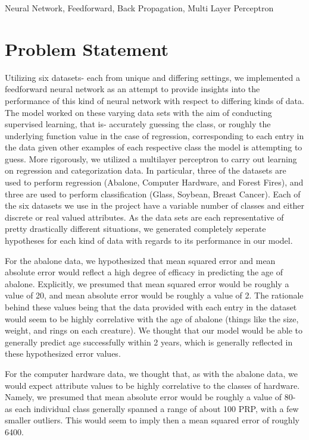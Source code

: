 \documentclass[twoside,11pt]{article}
\begin{document}
\begin{keywords}
	Neural Network, Feedforward, Back Propagation, Multi Layer Perceptron
\end{keywords}

\section{Problem Statement}
Utilizing six datasets- each from unique and differing settings, we implemented a feedforward neural network as an attempt to provide insights 
into the performance of this kind of neural network with respect to differing kinds of data. The model worked on these varying data sets with the aim
of conducting supervised learning, that is- accurately guessing the class, or roughly the underlying function value in the case of regression, 
corresponding to each entry in the data given other examples of each respective
class the model is attempting to guess. More rigorously, we utilized a multilayer perceptron 
to carry out learning on regression and categorization data. In particular, three of the datasets are used to perform regression 
(Abalone, Computer Hardware, and Forest Fires),
  and three are used to perform classification (Glass, Soybean, Breast Cancer). Each of the six datasets we use in the project have a variable 
  number of classes and either discrete or real valued attributes. As the data sets are each representative of pretty drastically different situations,
  we generated completely seperate hypotheses for each kind of data with regards to its performance in our model. 
  
  For the abalone data, we hypothesized that
  mean squared error and mean absolute error would reflect a high degree of efficacy in predicting the age of abalone. Explicitly, we presumed that mean squared 
  error would be roughly a value of 20, and mean absolute
  error would be roughly a value of 2. The rationale behind these values being that the data provided with each entry in the dataset would seem to be highly correlative
  with the age of abalone (things like the size, weight, and rings on each creature). We thought that our model would be able to generally predict age successfully within
  2 years, which is generally reflected in these hypothesized error values.
  
  For the computer hardware data, we thought that, as with the abalone data, we would expect attribute values to be highly correlative to the classes of hardware.
  Namely, we presumed that mean absolute error would be roughly a value of 80- as each individual class generally spanned a range of about 100 PRP, with a few 
  smaller outliers. This would seem to imply then a mean squared error of roughly 6400.
\end{document}
